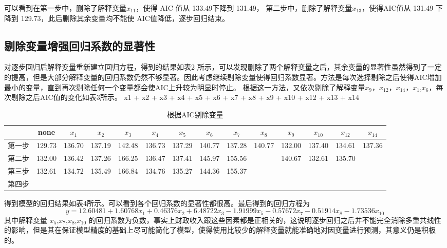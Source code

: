 \documentclass [a4paper]{article}
\begin{document}
可以看到在第一步中，删除了解释变量$x_{11}$，使得 AIC 值从 133.49下降到 131.49，
第二步中，删除了解释变量$x_{13}$，使得AIC值从 131.49 下降到 129.73，此后删除其余变量均不能使 AIC值降低，逐步回归结束。
\subsection{剔除变量增强回归系数的显著性}
对逐步回归后解释变量重新建立回归方程，得到的结果如表2 所示，可以发现删除了两个解释变量之后，其余变量的显著性虽然得到了一定的提高，但是大部分解释变量的回归系数仍然不够显著。因此考虑继续剔除变量使得回归系数显著。方法是每次选择剔除之后使得AIC增加最小的变量，直到再次剔除任何一个变量都会使AIC上升较为明显时停止。
根据这一方法，又依次剔除了解释变量$x_{9}$，$x_{12}$，$x_{14}$，$x_1$,$x_6$，每次剔除之后AIC值的变化如表3所示。
x1 + x2 + x3 + x4 + x5 + x6 + x7 + x8 + x9 + x10 + x12 +
    x13 + x14
\begin{table}
  \caption{根据AIC剔除变量}
  \label{}
  \tiny
  \centering
  \begin{tabular}{cccccccccccccc}
    \toprule
    &none&$x_1$&$x_2$&$x_3$&$x_4$&$x_5$&$x_6$&$x_7$&$x_8$&$x_9$&$x_{10}$&$x_{12}$&$x_{14}$\\
    \midrule
    第一步&129.73&136.70&137.19&142.48&136.73&137.29&140.77&137.28&140.77&132.00&137.40&134.61&137.36\\
    第二步&132.00&136.42&137.26&166.25&136.47&137.41&145.97&155.56&&140.67&132.61&135.70\\
    第三步&132.61&134.72&135.49&166.84&134.76&135.27&144.36&155.37&&\\
    第四步&\\

    \bottomrule
  \end{tabular}

\end{table}

得到模型的回归结果如表4所示。可以看到各个回归系数的显著性都很高。最后得到的回归方程为
$$y = 12.60481 +1.60768x_1 +0.46376x_2+6.48722x_3 -1.91999x_5 -0.57672x_7 -0.51914x_8 - 1.73536x_{10}$$
其中解释变量 $x_5$,$x_7$,$x_8$,$x_{10}$ 的回归系数为负数，事实上财政收入跟这些因素都是正相关的，这说明逐步回归之后并不能完全消除多重共线性的影响，但是其在保证模型精度的基础上尽可能简化了模型，使得使用比较少的解释变量就能准确地对因变量进行预测，其意义仍是积极的。
\begin{table}
  \caption{}
  \label{}

\end{table}
\end{document}
